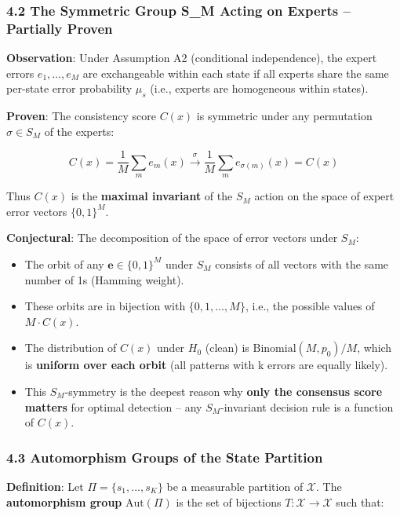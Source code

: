 \documentclass[
  12pt,
]{article}
\providecommand{\tightlist}{%
  \setlength{\itemsep}{0pt}\setlength{\parskip}{0pt}}
\begin{document}
\subsubsection{4.2 The Symmetric Group S\_M Acting on Experts --
Partially
Proven}\label{the-symmetric-group-s_m-acting-on-experts-partially-proven}

\textbf{Observation}: Under Assumption A2 (conditional independence),
the expert errors \(e_1, \dots, e_M\) are exchangeable within each state
if all experts share the same per-state error probability \(\mu_s\)
(i.e., experts are homogeneous within states).

\textbf{Proven}: The consistency score \(C(x)\) is symmetric under any
permutation \(\sigma \in S_M\) of the experts:

\[C(x) = \frac{1}{M}\sum_m e_m(x) \xrightarrow{\sigma} \frac{1}{M}\sum_m e_{\sigma(m)}(x) = C(x)\]

Thus \(C(x)\) is the \textbf{maximal invariant} of the \(S_M\) action on
the space of expert error vectors \(\{0,1\}^M\).

\textbf{Conjectural}: The decomposition of the space of error vectors
under \(S_M\):

\begin{itemize}
\tightlist
\item
  The orbit of any \(\mathbf{e} \in \{0,1\}^M\) under \(S_M\) consists
  of all vectors with the same number of 1s (Hamming weight).
\item
  These orbits are in bijection with \(\{0, 1, \dots, M\}\), i.e., the
  possible values of \(M \cdot C(x)\).
\item
  The distribution of \(C(x)\) under \(H_0\) (clean) is
  \(\text{Binomial}(M, p_0)/M\), which is \textbf{uniform over each
  orbit} (all patterns with k errors are equally likely).
\item
  This \(S_M\)-symmetry is the deepest reason why \textbf{only the
  consensus score matters} for optimal detection -- any
  \(S_M\)-invariant decision rule is a function of \(C(x)\).
\end{itemize}

\subsubsection{4.3 Automorphism Groups of the State
Partition}\label{automorphism-groups-of-the-state-partition}

\textbf{Definition}: Let \(\Pi = \{s_1, \dots, s_K\}\) be a measurable
partition of \(\mathcal{X}\). The \textbf{automorphism group}
\(\text{Aut}(\Pi)\) is the set of bijections
\(T: \mathcal{X} \to \mathcal{X}\) such that:
\end{document}

